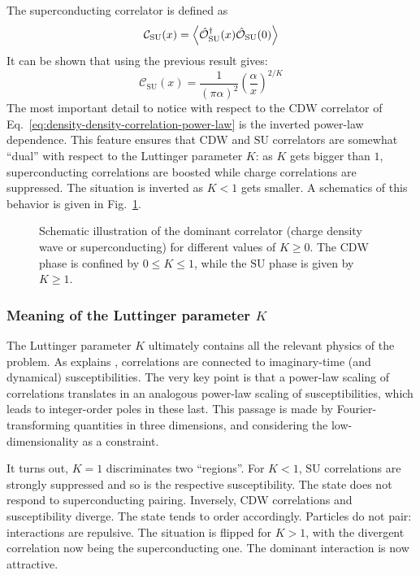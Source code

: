 The superconducting correlator is defined as
\[
	\mathcal{C}_\mathrm{SU}(x) = \ev{\hat{\mathcal{O}}_\mathrm{SU}^\dagger(x) \hat{\mathcal{O}}_\mathrm{SU}(0)}
\]
It can be shown that using the previous result gives:
\begin{equation}\label{eq:superconducting-correlation-power-law}
	\mathcal{C}_\mathrm{SU}(x) = \frac{1}{(\pi\alpha)^2} \left(
		\frac{\alpha}{x}
	\right)^{2/K}
\end{equation}
The most important detail to notice with respect to the $\mathrm{CDW}$ correlator of Eq.~\eqref{eq:density-density-correlation-power-law} is the inverted power-law dependence. This feature ensures that $\mathrm{CDW}$ and $\mathrm{SU}$ correlators are somewhat ``dual'' with respect to the Luttinger parameter $K$: as $K$ gets bigger than $1$, superconducting correlations are boosted while charge correlations are suppressed. The situation is inverted as $K<1$ gets smaller. A schematics of this behavior is given in Fig.~\ref{fig:k-luttinger-phases}.

\begin{figure}
	\centering
	
	\caption{Schematic illustration of the dominant correlator (charge density wave or superconducting) for different values of $K \ge 0$. The $\mathrm{CDW}$ phase is confined by $0 \le K \le 1$, while the $\mathrm{SU}$ phase is given by $K \ge 1$.}
	\label{fig:k-luttinger-phases}
\end{figure}

\subsubsection{Meaning of the Luttinger parameter $K$}\label{subsubsec:meaning-of-the-luttinger-parameter-K}

The Luttinger parameter $K$ ultimately contains all the relevant physics of the problem. As \citeauthor{giamarchi2003quantum} explains \cite[Sec.~2.2.2]{giamarchi2003quantum}, correlations are connected to imaginary-time (and dynamical) susceptibilities. The very key point is that a power-law scaling of correlations translates in an analogous power-law scaling of susceptibilities, which leads to integer-order poles in these last. This passage is made by Fourier-transforming quantities in three dimensions, and considering the low-dimensionality as a constraint.

It turns out, $K=1$ discriminates two ``regions''. For $K<1$, $\mathrm{SU}$ correlations are strongly suppressed and so is the respective susceptibility. The state does not respond to superconducting pairing. Inversely, $\mathrm{CDW}$ correlations and susceptibility diverge. The state tends to order accordingly. Particles do not pair: interactions are repulsive. The situation is flipped for $K>1$, with the divergent correlation now being the superconducting one. The dominant interaction is now attractive. 

